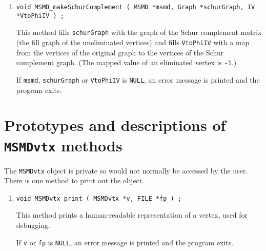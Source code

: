 \begin{enumerate}
\item
\begin{verbatim}
void MSMD_makeSchurComplement ( MSMD *msmd, Graph *schurGraph, IV *VtoPhiIV ) ;
\end{verbatim}
This method fills {\tt schurGraph} with the graph of the Schur
complement matrix (the fill graph of the uneliminated vertices)
and fills {\tt VtoPhiIV} with a map from the vertices of the
original graph to the vertices of the Schur complement graph.
(The mapped value of an eliminated vertex is {\tt -1}.)
\par {}
If {\tt msmd}, {\tt schurGraph} or {\tt VtoPhiIV} is {\tt NULL},
an error message is printed and the program exits.
\end{enumerate}
\par
\par
\section{Prototypes and descriptions of {\tt MSMDvtx} methods}
\label{section:MSMDvtx:proto}
\par
The {\tt MSMDvtx} object is private so would not normally be
accessed by the user. There is one method to print out the object.
\begin{enumerate}
\item
\begin{verbatim}
void MSMDvtx_print ( MSMDvtx *v, FILE *fp ) ;
\end{verbatim}
This method prints a human-readable representation of a vertex,
used for debugging.
\par {}
If {\tt v} or {\tt fp} is {\tt NULL},
an error message is printed and the program exits.
\end{enumerate}
